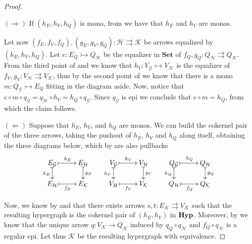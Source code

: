 \documentclass[3p]{elsarticle}
\newcommand{\Set}{\mathbf{Set}}
\newcommand{\catname}[1]{\textbf{\textup{#1}}}
\newcommand{\hyp}{\catname{Hyp}}
\newcommand{\mto}{\rightarrowtail}
\theoremstyle{remark}
\theoremstyle{definition}
\begin{document}
\mn*

\begin{proof}\label{proof:regmono}

$(\Rightarrow)$	If $(h_E, h_V, h_Q)$ is mono, from  we have that $h_E$ and $h_V$ are monos.

\noindent
	\parbox{11cm}{
		\hspace{15pt}Let now $(f_E, f_V, f_Q), (g_E, g_V, g_Q): \mathcal{H\rightrightarrows K}$ be arrows equalized by $(h_E, h_V, h_Q)$. Let $e\colon E_Q\mto Q_{\mathcal{H}}$ be the equalizer in
	$\Set$ of $f_Q, g_Q\colon Q_{\mathcal{H}}\rightrightarrows Q_{\mathcal{K}}$. From the third point of  and  we know that $h_V\colon V_{\mathcal{G}}\mto V_{\mathcal{H}} $ 
	is the equalizer of $f_V, g_V\colon V_{\mathcal{H}}\rightrightarrows V_{\mathcal{K}}$, thus by the second point of  we know that there is a mono 
	$m\colon Q_{\mathcal{G}}\mto E_Q$ fitting in the diagram aside. Now, notice that 
	$e\circ m\circ q_{\mathcal{G}}=q_\mathcal{H}\circ h_V=h_{Q}\circ q_{\mathcal{G}}$.
	Since $q_{\mathcal{G}}$ is epi we conclude that $e\circ m=h_Q$, from which the claim follows.}
	\hfill
	\parbox{2cm}{}   
	
	$(\Leftarrow)$ Suppose that $h_E$, $h_V$, and $h_Q$  are monos. 
	We can build the cokernel pair of the three arrows, taking the pushout of $h_E$, $h_V$ and $h_Q$ along itself, obtaining the three diagrams below, which by  are also pullbacks
	\[     \xymatrix@R=15pt{
	E_\mathcal{G} \ar@{>->}[d]_{h_E} \ar@{>->}[r]^{h_E}&E_\mathcal{H} \ar@{>->}[d]^{g_E} &	V_\mathcal{G} \ar@{>->}[d]_{h_V} \ar@{>->}[r]^{h_V}& V_\mathcal{H} \ar@{>->}[d]^{g_V} &Q_\mathcal{G} \ar@{>->}[d]_{h_Q} \ar@{>->}[r]^{h_Q}& Q_\mathcal{H} \ar@{>->}[d]^{g_Q} \\
		E_\mathcal{H} \ar@{>->}[r]_{f_E} & E_\mathcal{{K}} & V_H \ar@{>->}[r]_{f_V} & V_\mathcal{{K}} & Q_\mathcal{H} \ar@{>->}[r]_{f_Q} & Q_\mathcal{{K}}
	}
	\]   
	
	Now, we know by  and  that there exists arrows $s,t\colon E_{\mathcal{K}}\rightrightarrows V_{\mathcal{K}}$ such that the resulting hypergraph is the cokernel pair of $(h_E, h_V)$ in $\hyp$. Moreover, by  we know that the unique arrow $q\colon V_{\mathcal{K}}\to Q_{\mathcal{K}}$
	induced by $q_{Q}\circ q_{\mathcal{H}}$ and $f_{Q}\circ q_{\mathcal{H}}$ is a regular epi. Let thus $\mathcal{K}$ be the resulting hypergraph with equivalence.
	

\end{proof}
\end{document}

